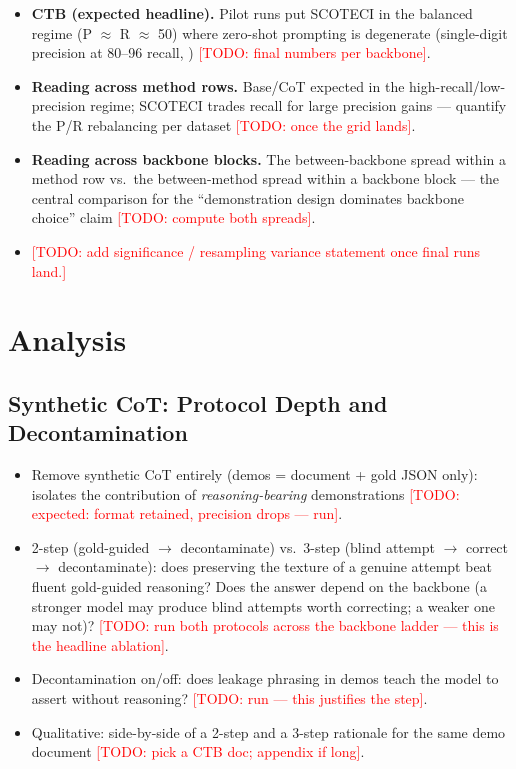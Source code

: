 \documentclass[11pt]{article}
\newcommand{\todo}[1]{\textcolor{red}{[TODO: #1]}}
\newcommand{\method}{SCOTECI}
\begin{document}
\begin{itemize}
  \item \textbf{CTB (expected headline).} Pilot runs put \method{} in the
        balanced regime (P $\approx$ R $\approx$ 50) where zero-shot prompting
        is degenerate (single-digit precision at 80--96 recall,
        \citealp{gao2023chatgpt}) \todo{final numbers per backbone}.
  \item \textbf{Reading across method rows.} Base/CoT expected in the
        high-recall/low-precision regime; \method{} trades recall for large
        precision gains --- quantify the P/R rebalancing per dataset
        \todo{once the grid lands}.
  \item \textbf{Reading across backbone blocks.} The between-backbone spread
        within a method row vs.\ the between-method spread within a backbone
        block --- the central comparison for the ``demonstration design
        dominates backbone choice'' claim \todo{compute both spreads}.
  \item \todo{add significance / resampling variance statement once final runs
        land.}
\end{itemize}

\section{Analysis}
\label{sec:analysis}

\subsection{Synthetic CoT: Protocol Depth and Decontamination}
\label{sec:ablations-cot}
\begin{itemize}
  \item Remove synthetic CoT entirely (demos = document + gold JSON only):
        isolates the contribution of \emph{reasoning-bearing} demonstrations
        \todo{expected: format retained, precision drops --- run}.
  \item 2-step (gold-guided $\to$ decontaminate) vs.\ 3-step (blind attempt
        $\to$ correct $\to$ decontaminate): does preserving the texture of a
        genuine attempt beat fluent gold-guided reasoning? Does the answer
        depend on the backbone (a stronger model may produce blind attempts
        worth correcting; a weaker one may not)? \todo{run both protocols
        across the backbone ladder --- this is the headline ablation}.
  \item Decontamination on/off: does leakage phrasing in demos teach the model
        to assert without reasoning? \todo{run --- this justifies the step}.
  \item Qualitative: side-by-side of a 2-step and a 3-step rationale for the
        same demo document \todo{pick a CTB doc; appendix if long}.
\end{itemize}
\end{document}
